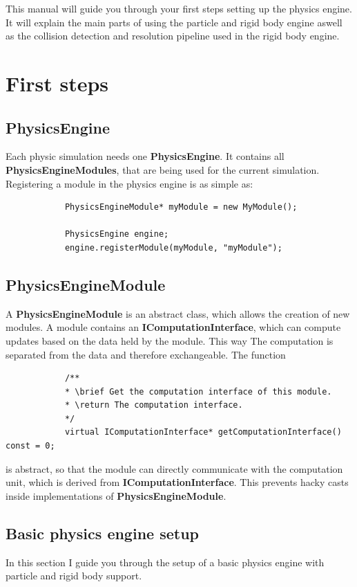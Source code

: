 \documentclass[12p, paper=a4, leqno, colorinlistoftodos]{article}
\begin{document}
	This manual will guide you through your first steps setting up the physics engine. It will explain the main parts of using the particle and rigid body engine aswell as the collision detection and resolution pipeline used in the rigid body engine.
	
	\pagebreak
	\section{First steps}
		\subsection{PhysicsEngine}
		Each physic simulation needs one \textbf{PhysicsEngine}. It contains all \textbf{PhysicsEngineModules}, that are being used for the current simulation. Registering a module in the physics engine is as simple as:
		
		\begin{lstlisting}
			PhysicsEngineModule* myModule = new MyModule();
		
			PhysicsEngine engine;
			engine.registerModule(myModule, "myModule");
		\end{lstlisting}
	
		\subsection{PhysicsEngineModule}
		A \textbf{PhysicsEngineModule} is an abstract class, which allows the creation of new modules. A module contains an \textbf{IComputationInterface}, which can compute updates based on the data held by the module. This way The computation is separated from the data and therefore exchangeable. The function
		\begin{lstlisting}
			/**
			* \brief Get the computation interface of this module.
			* \return The computation interface.
			*/
			virtual IComputationInterface* getComputationInterface() const = 0;
		\end{lstlisting}
		is abstract, so that the module can directly communicate with the computation unit, which is derived from \textbf{IComputationInterface}. This prevents hacky casts inside implementations of \textbf{PhysicsEngineModule}.
		
		
		\subsection{Basic physics engine setup}
		In this section I guide you through the setup of a basic physics engine with particle and rigid body support.
		
\end{document}
